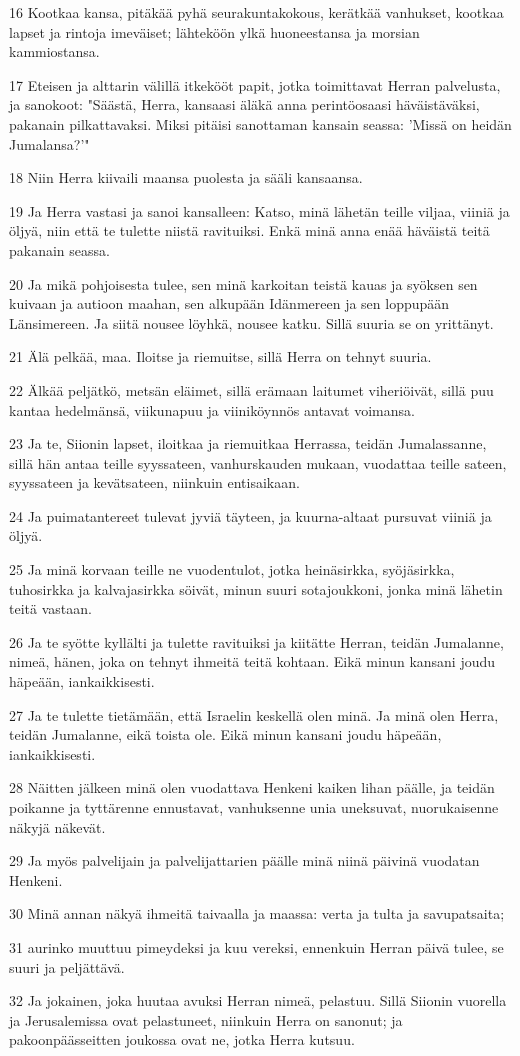 \par 16 Kootkaa kansa, pitäkää pyhä seurakuntakokous, kerätkää vanhukset, kootkaa lapset ja rintoja imeväiset; lähteköön ylkä huoneestansa ja morsian kammiostansa.
\par 17 Eteisen ja alttarin välillä itkekööt papit, jotka toimittavat Herran palvelusta, ja sanokoot: "Säästä, Herra, kansaasi äläkä anna perintöosaasi häväistäväksi, pakanain pilkattavaksi. Miksi pitäisi sanottaman kansain seassa: 'Missä on heidän Jumalansa?'"
\par 18 Niin Herra kiivaili maansa puolesta ja sääli kansaansa.
\par 19 Ja Herra vastasi ja sanoi kansalleen: Katso, minä lähetän teille viljaa, viiniä ja öljyä, niin että te tulette niistä ravituiksi. Enkä minä anna enää häväistä teitä pakanain seassa.
\par 20 Ja mikä pohjoisesta tulee, sen minä karkoitan teistä kauas ja syöksen sen kuivaan ja autioon maahan, sen alkupään Idänmereen ja sen loppupään Länsimereen. Ja siitä nousee löyhkä, nousee katku. Sillä suuria se on yrittänyt.
\par 21 Älä pelkää, maa. Iloitse ja riemuitse, sillä Herra on tehnyt suuria.
\par 22 Älkää peljätkö, metsän eläimet, sillä erämaan laitumet viheriöivät, sillä puu kantaa hedelmänsä, viikunapuu ja viiniköynnös antavat voimansa.
\par 23 Ja te, Siionin lapset, iloitkaa ja riemuitkaa Herrassa, teidän Jumalassanne, sillä hän antaa teille syyssateen, vanhurskauden mukaan, vuodattaa teille sateen, syyssateen ja kevätsateen, niinkuin entisaikaan.
\par 24 Ja puimatantereet tulevat jyviä täyteen, ja kuurna-altaat pursuvat viiniä ja öljyä.
\par 25 Ja minä korvaan teille ne vuodentulot, jotka heinäsirkka, syöjäsirkka, tuhosirkka ja kalvajasirkka söivät, minun suuri sotajoukkoni, jonka minä lähetin teitä vastaan.
\par 26 Ja te syötte kyllälti ja tulette ravituiksi ja kiitätte Herran, teidän Jumalanne, nimeä, hänen, joka on tehnyt ihmeitä teitä kohtaan. Eikä minun kansani joudu häpeään, iankaikkisesti.
\par 27 Ja te tulette tietämään, että Israelin keskellä olen minä. Ja minä olen Herra, teidän Jumalanne, eikä toista ole. Eikä minun kansani joudu häpeään, iankaikkisesti.
\par 28 Näitten jälkeen minä olen vuodattava Henkeni kaiken lihan päälle, ja teidän poikanne ja tyttärenne ennustavat, vanhuksenne unia uneksuvat, nuorukaisenne näkyjä näkevät.
\par 29 Ja myös palvelijain ja palvelijattarien päälle minä niinä päivinä vuodatan Henkeni.
\par 30 Minä annan näkyä ihmeitä taivaalla ja maassa: verta ja tulta ja savupatsaita;
\par 31 aurinko muuttuu pimeydeksi ja kuu vereksi, ennenkuin Herran päivä tulee, se suuri ja peljättävä.
\par 32 Ja jokainen, joka huutaa avuksi Herran nimeä, pelastuu. Sillä Siionin vuorella ja Jerusalemissa ovat pelastuneet, niinkuin Herra on sanonut; ja pakoonpäässeitten joukossa ovat ne, jotka Herra kutsuu.

